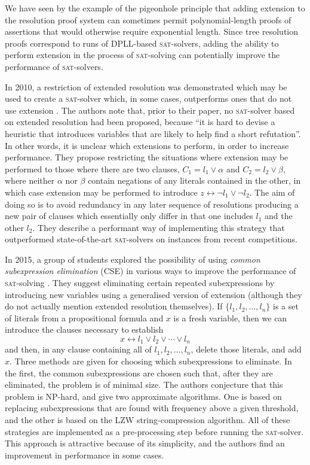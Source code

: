 \documentclass[pdftex,11pt,a4]{article}
\newcommand{\sat}{\textsc{sat}}
\begin{document}
We have seen by the example of the pigeonhole principle that adding extension to the resolution proof system can sometimes permit polynomial-length proofs of assertions that would otherwise require exponential length. Since tree resolution proofs correspond to runs of DPLL-based \sat{}-solvers, adding the ability to perform extension in the process of \sat{}-solving can potentially improve the performance of \sat{}-solvers.

In 2010, a restriction of extended resolution was demonstrated which may be used to create a \sat{}-solver which, in some cases, outperforms ones that do not use extension \cite{Audemard:2010}. The authors note that, prior to their paper, no \sat{}-solver based on extended resolution had been proposed, because ``it is hard to devise a heuristic that introduces variables that are likely to help find a short refutation''. In other words, it is unclear which extensions to perform, in order to increase performance. They propose restricting the situations where extension may be performed to those where there are two clauses, $C_1 = l_1 \vee \alpha$ and $C_2 = l_2 \vee \beta$, where neither $\alpha$ nor $\beta$ contain negations of any literals contained in the other, in which case extension may be performed to introduce $z \leftrightarrow \neg l_1 \vee \neg l_2$. The aim of doing so is to avoid redundancy in any later sequence of resolutions producing a new pair of clauses which essentially only differ in that one includes $l_1$ and the other $l_2$. They describe a performant way of implementing this strategy that outperformed state-of-the-art \sat{}-solvers on instances from recent competitions.

In 2015, a group of students explored the possibility of using \emph{common subexpression elimination} (CSE) in various ways to improve the performance of \sat{}-solving \cite{Yan:2015}. They suggest eliminating certain repeated subexpressions by introducing new variables using a generalised version of extension (although they do not actually mention extended resolution themselves). If $\{l_1, l_2, \ldots, l_n\}$ is a set of literals from a propositional formula and $x$ is a fresh variable, then we can introduce the clauses necessary to establish
\[x \leftrightarrow l_1 \vee l_2 \vee \cdots \vee l_n\]
and then, in any clause containing all of $l_1, l_2, \ldots, l_n$, delete those literals, and add $x$. Three methods are given for choosing which subexpressions to eliminate. In the first, the common subexpressions are chosen such that, after they are eliminated, the problem is of minimal size. The authors conjecture that this problem is NP-hard, and give two approximate algorithms. One is based on replacing subexpressions that are found with frequency above a given threshold, and the other is based on the LZW string-compression algorithm. All of these strategies are implemented as a pre-processing step before running the \sat{}-solver. This approach is attractive because of its simplicity, and the authors find an improvement in performance in some cases.
\end{document}

